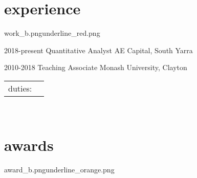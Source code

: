 \documentclass[a4paper]{friggeri-cv} %
\newcommand{\spacer}{\vspace{0.0cm}}
\begin{document}
\section{experience}{work_b.png}{underline_red.png}




\begin{entrylist}
\entry
{2018-present\phantom{X}}
{Quantitative {\normalfont Analyst}}
{AE Capital, South Yarra}
{

}

%
%
%


\entry
{2010-2018}
{Teaching {\normalfont Associate}}
{Monash University, Clayton}
{
\begin{tabular}{p{8cm}l}
duties: 
\end{tabular}




}\\
%





\end{entrylist}

\spacer
\section{awards}{award_b.png}{underline_orange.png}
\end{document}
